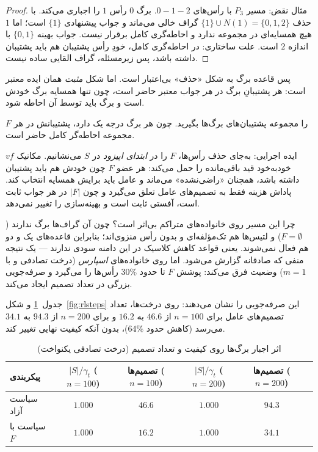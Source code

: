 \begin{proof}
مثال نقض: مسیر $P_3$ با رأس‌های $0-1-2$. برگ $0$ رأس $1$ را اجباری می‌کند. با
حذف $\{1\}\cup N(1)=\{0,1,2\}$ گراف خالی می‌ماند و جواب پیشنهادی $\{1\}$ است؛
اما $1$ هیچ همسایه‌ای در مجموعه ندارد و احاطه‌گری کامل برقرار نیست. جواب بهینه
$\{0,1\}$ با اندازه $2$ است. علت ساختاری: در احاطه‌گری کامل، خودِ رأس پشتیبان هم
باید پشتیبان داشته باشد، پس زیرمسئله، گراف القایی ساده نیست.
\end{proof}

پس قاعده برگ به شکل «حذف» بی‌اعتبار است. اما شکل \emph{مثبت} همان ایده معتبر است:
هر پشتیبانِ برگ در \emph{هر} جواب معتبر حاضر است، چون تنها همسایه برگ خودش است
و برگ باید توسط آن احاطه شود.

\begin{definition}
\label{def:forced}
$F$ را مجموعه پشتیبان‌های برگ‌ها بگیرید. چون هر برگ درجه یک دارد، پشتیبانش در
هر مجموعه احاطه‌گر کامل حاضر است.
\end{definition}

ایده اجرایی: به‌جای حذف رأس‌ها، $F$ را در \emph{ابتدای اپیزود} در $S$ می‌نشانیم.
مکانیک $vf$ خودبه‌خود قید باقی‌مانده را حمل می‌کند: هر عضو $F$ چون خودش هم باید
پشتیبان داشته باشد، همچنان «راضی‌نشده» می‌ماند و عامل باید برایش همسایه انتخاب
کند. پاداش هزینه فقط به تصمیم‌های عامل تعلق می‌گیرد و چون $|F|$ در هر جواب
ثابت است، آفستی ثابت است و بهینه‌سازی را تغییر نمی‌دهد.

چرا این مسیر روی خانواده‌های متراکم بی‌اثر است؟ چون آن گراف‌ها برگ ندارند
($F=\emptyset$) و لتیس‌ها هم تک‌مؤلفه‌ای و بدون رأس منزوی‌اند؛ بنابراین قاعده‌های
یک و دو هم فعال نمی‌شوند. یعنی قواعد کاهش کلاسیک در این دامنه سودی ندارند — یک
نتیجه منفی که صادقانه گزارش می‌شود. اما روی خانواده‌های \emph{اسپارس} (درخت
تصادفی و  با $m=1$) وضعیت فرق می‌کند: پوشش $F$ تا حدود $30\%$ رأس‌ها را
می‌گیرد و صرفه‌جویی بزرگی در تعداد تصمیم ایجاد می‌کند.

جدول~\ref{tab:forcing} و شکل~\ref{fig:rlsteps} این صرفه‌جویی را نشان می‌دهند:
روی درخت‌ها، تعداد تصمیم‌های عامل برای $n=100$ از $46.6$ به $16.2$ و برای
$n=200$ از $94.3$ به $34.1$ می‌رسد (کاهش حدود $64\%$)، بدون آنکه کیفیت نهایی
تغییر کند.

\begin{table}[ht]
  \centering
  \caption{اثر اجبار برگ‌ها روی کیفیت و تعداد تصمیم (درخت تصادفی یکنواخت)}
  \label{tab:forcing}
  \begin{tabular}{lccccc}
    \toprule
    پیکربندی & $|S|/\gamma_t$ ($n=100$) & تصمیم‌ها ($n=100$) & $|S|/\gamma_t$ ($n=200$) & تصمیم‌ها ($n=200$) \\
    \midrule
    سیاست آزاد & $1.000$ & $46.6$ & $1.000$ & $94.3$ \\
    سیاست با $F$ & $1.000$ & $16.2$ & $1.000$ & $34.1$ \\
    \bottomrule
  \end{tabular}
\end{table}

